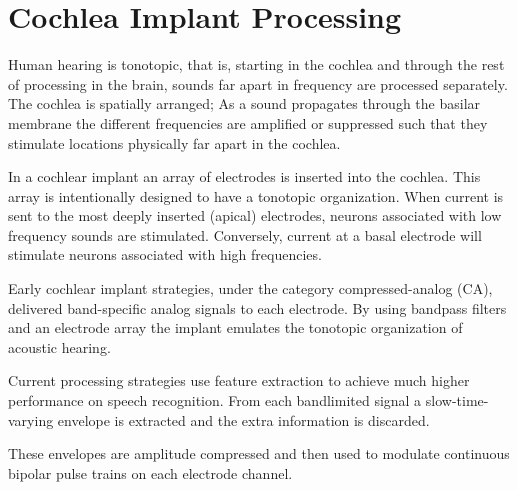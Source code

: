 \documentclass [11pt, proquest,oneside] {uwthesis}[2015/03/03]
\begin{document}

\chapter{Cochlea Implant Processing}

Human hearing is tonotopic, that is, starting in the cochlea and through the rest of processing in the brain, sounds far apart in frequency are processed separately.  The cochlea is spatially arranged; As a sound propagates through the basilar membrane the different frequencies are amplified or suppressed such that they stimulate locations physically far apart in the cochlea.


In a cochlear implant an array of electrodes is inserted into the cochlea.  This array is intentionally designed to have a tonotopic organization.  When current is sent to the most deeply inserted (apical) electrodes, neurons associated with low frequency sounds are stimulated.  Conversely, current at a basal electrode will stimulate neurons associated with high frequencies.

Early cochlear implant strategies, under the category compressed-analog (CA), delivered band-specific analog signals to each electrode.  By using bandpass filters and an electrode array the implant emulates the tonotopic organization of acoustic hearing.

Current processing strategies use feature extraction to achieve much higher performance on speech recognition.  From each bandlimited signal a slow-time-varying envelope is extracted and the extra information is discarded.

These envelopes are amplitude compressed and then used to modulate continuous bipolar pulse trains on each electrode channel.
\end{document}
